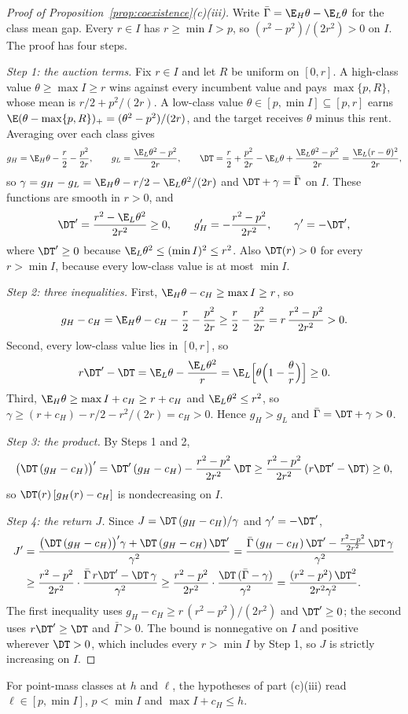 \begin{proof}[Proof of Proposition~\ref{prop:coexistence}(c)(iii)]
Write \(\bar\Gamma=\E_H\theta-\E_L\theta\) for the class mean gap. Every \(r\in I\) has \(r\ge\min I>p\), so
\((r^2-p^2)/(2r^2)>0\) on \(I\). The proof has four steps.

\emph{Step 1: the auction terms.} Fix \(r\in I\) and let \(R\) be uniform on \([0,r]\). A high-class value
\(\theta\ge\max I\ge r\) wins against every incumbent value and pays \(\max\{p,R\}\), whose mean is
\(r/2+p^2/(2r)\). A low-class value \(\theta\in[p,\min I]\subseteq[p,r]\) earns
\(\E(\theta-\max\{p,R\})_+=(\theta^2-p^2)/(2r)\), and the target receives \(\theta\) minus this rent. Averaging over
each class gives
\[
g_H=\E_H\theta-\frac r2-\frac{p^2}{2r},\qquad g_L=\frac{\E_L\theta^2-p^2}{2r},\qquad
\DT=\frac r2+\frac{p^2}{2r}-\E_L\theta+\frac{\E_L\theta^2-p^2}{2r}=\frac{\E_L(r-\theta)^2}{2r},
\]
so \(\gamma=g_H-g_L=\E_H\theta-r/2-\E_L\theta^2/(2r)\) and \(\DT+\gamma=\bar\Gamma\) on \(I\). These functions are smooth
in \(r>0\), and
\[
\DT'=\frac{r^2-\E_L\theta^2}{2r^2}\ge0,\qquad g_H'=-\frac{r^2-p^2}{2r^2},\qquad \gamma'=-\DT',
\]
where \(\DT'\ge0\) because \(\E_L\theta^2\le(\min I)^2\le r^2\). Also \(\DT(r)>0\) for every \(r>\min I\), because every
low-class value is at most \(\min I\).

\emph{Step 2: three inequalities.} First, \(\E_H\theta-c_H\ge\max I\ge r\), so
\[
g_H-c_H=\E_H\theta-c_H-\frac r2-\frac{p^2}{2r}\ge\frac r2-\frac{p^2}{2r}=r\,\frac{r^2-p^2}{2r^2}>0 .
\]
Second, every low-class value lies in \([0,r]\), so
\[
r\DT'-\DT=\E_L\theta-\frac{\E_L\theta^2}{r}=\E_L\Bigl[\theta\Bigl(1-\frac\theta r\Bigr)\Bigr]\ge0 .
\]
Third, \(\E_H\theta\ge\max I+c_H\ge r+c_H\) and \(\E_L\theta^2\le r^2\), so \(\gamma\ge(r+c_H)-r/2-r^2/(2r)=c_H>0\).
Hence \(g_H>g_L\) and \(\bar\Gamma=\DT+\gamma>0\).

\emph{Step 3: the product.} By Steps 1 and 2,
\[
\bigl(\DT\,(g_H-c_H)\bigr)'=\DT'\,(g_H-c_H)-\frac{r^2-p^2}{2r^2}\,\DT\ge\frac{r^2-p^2}{2r^2}\,(r\DT'-\DT)\ge0 ,
\]
so \(\DT(r)\,[g_H(r)-c_H]\) is nondecreasing on \(I\).

\emph{Step 4: the return \(J\).} Since \(J=\DT\,(g_H-c_H)/\gamma\) and \(\gamma'=-\DT'\),
\begin{align*}
J'&=\frac{\bigl(\DT\,(g_H-c_H)\bigr)'\gamma+\DT\,(g_H-c_H)\,\DT'}{\gamma^2}
=\frac{\bar\Gamma\,(g_H-c_H)\,\DT'-\frac{r^2-p^2}{2r^2}\,\DT\,\gamma}{\gamma^2}\\
&\ge\frac{r^2-p^2}{2r^2}\cdot\frac{\bar\Gamma\,r\DT'-\DT\,\gamma}{\gamma^2}
\ge\frac{r^2-p^2}{2r^2}\cdot\frac{\DT\,(\bar\Gamma-\gamma)}{\gamma^2}=\frac{(r^2-p^2)\,\DT^2}{2r^2\gamma^2}.
\end{align*}
The first inequality uses \(g_H-c_H\ge r\,(r^2-p^2)/(2r^2)\) and \(\DT'\ge0\); the second uses \(r\DT'\ge\DT\) and
\(\bar\Gamma>0\). The bound is nonnegative on \(I\) and positive wherever \(\DT>0\), which includes every \(r>\min I\) by
Step 1, so \(J\) is strictly increasing on \(I\).
\end{proof}

For point-mass classes at \(h\) and \(\ell\), the hypotheses of part (c)(iii) read \(\ell\in[p,\min I]\),
\(p<\min I\) and \(\max I+c_H\le h\).
